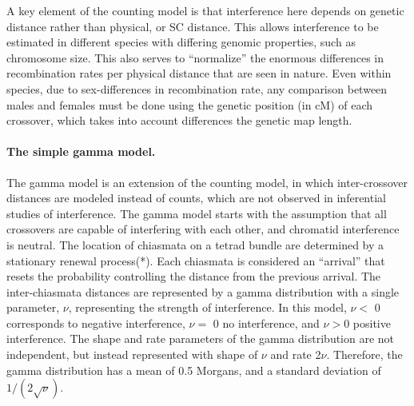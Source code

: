 A key element of the counting model is that interference here depends on genetic distance rather than physical, or SC distance.
This allows interference to be estimated in different species with differing genomic properties, such as chromosome size.
This also serves to ``normalize'' the enormous differences in recombination rates per physical distance that are seen in nature.
Even within species, due to sex-differences in recombination rate, any comparison between males and females must be done using the genetic position (in cM) of each crossover, which takes into account differences the genetic map length.




\paragraph{The simple gamma model.} \label{cointTPM}

The gamma model is an extension of the counting model, in which inter-crossover distances are modeled instead of counts, which are not observed in inferential studies of interference.
The gamma model starts with the assumption that all crossovers are capable of interfering with each other, and chromatid interference is neutral.
The location of chiasmata on a tetrad bundle are determined by a stationary renewal process(*).
Each chiasmata is considered an ``arrival'' that resets the probability controlling the distance from the previous arrival.
The inter-chiasmata distances are represented by a gamma distribution with a single parameter, $\nu$, representing the strength of interference.
In this model, $\nu <$ 0 corresponds to negative interference, $\nu=$ 0 no interference, and $\nu>$0 positive interference.
The shape and rate parameters of the gamma distribution are not independent, but instead represented with shape of $\nu$ and rate 2$\nu$.
Therefore, the gamma distribution has a mean of 0.5 Morgans, and a standard deviation of $1 / ( 2 \sqrt{\nu} )$.


